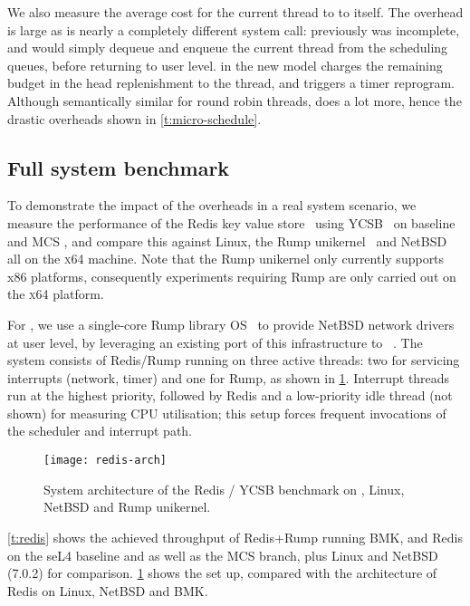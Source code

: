 We also measure the average cost for the current thread to \yield to itself. The overhead is large 
as \yield is nearly a completely different system call: previously \yield was incomplete, and would simply
dequeue and enqueue the current thread from the scheduling queues, before returning to user level.
\yield in the new model charges the remaining budget in the head replenishment to the thread, and
triggers a timer reprogram. Although semantically similar for round robin threads, \yield does a lot
more, hence the drastic overheads shown in \cref{t:micro-schedule}.

\subsection{Full system benchmark}
\label{s:evaluation-redis-overhead}

To demonstrate the impact of the overheads in a real system scenario, 
we measure the performance of the Redis key value store~\citep{redis:url} using 
\gls{YCSB}~\citep{Cooper_STRS_10} on baseline and MCS \selfour, and compare this
against Linux, the Rump unikernel~\citep{Kantee_Cormack_14} and 
NetBSD~\citep*{NetBSD:url} all on the \textsc{x64} machine. Note that the Rump unikernel only
currently supports x86 platforms, consequently experiments requiring Rump are only carried out on
the \textsc{x64} platform. 

For \selfour, we use a single-core Rump library OS~\citep{Kantee_Cormack_14} to provide 
NetBSD network drivers at user level, by leveraging an existing port of this infrastructure
to \selfour~\citep{McLeod:be}.
The system consists of Redis/Rump running on three active \selfour threads: 
two for servicing interrupts (network, timer) and one for Rump, as shown in
\cref{f:redis-arch}. Interrupt threads run at the highest priority,
followed by Redis and a low-priority idle thread (not shown) for measuring CPU utilisation;
this setup forces frequent invocations of the scheduler and interrupt path.

 \begin{figure}[ht]
    \centering
    \texttt{[image: redis-arch]}
    \caption[System architecture of Redis benchmark.]{System architecture of the Redis / \gls{YCSB} benchmark on \selfour, 
        Linux, NetBSD and Rump unikernel.}
    \label{f:redis-arch}
\end{figure}

\cref{t:redis} shows the achieved throughput of Redis+Rump
running \gls{BMK}, and Redis on the seL4 baseline and as well as the MCS
branch, plus Linux and NetBSD (7.0.2) for comparison. \cref{f:redis-arch} shows the \selfour set up,
compared with the architecture of Redis on Linux, NetBSD and \gls{BMK}. 

